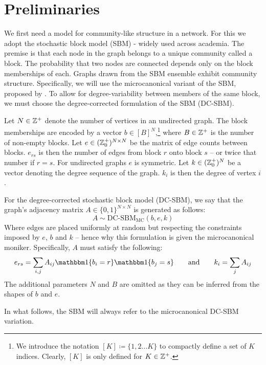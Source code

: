 \section{Preliminaries}

We first need a model for community-like structure in a network. For this we adopt the stochastic block model (SBM) - widely used across academia. The premise is that each node in the graph belongs to a unique community called a block. The probability that two nodes are connected depends only on the block memberships of each. Graphs drawn from the SBM ensemble exhibit community structure. Specifically, we will use the microcanonical variant of the SBM, proposed by \citet{Peixoto-Bayesian-Microcanonical}. To allow for degree-variability between members of the same block, we must choose the degree-corrected formulation of the SBM (DC-SBM).

\begin{definition}
	\label{defn:microcan-dc-sbm}
	Let $N \in \mathbb{Z}^{+}$ denote the number of vertices in an undirected graph. The block memberships are encoded by a vector $b \in [B]^N$,\footnote{We introduce the notation $[K] \coloneqq \{1, 2 \dots K\}$ to compactly define a set of $K$ indices. Clearly, $[K]$ is only defined for $K \in \mathbb{Z}^+$.}
	where $B \in \mathbb{Z}^{+}$ is the number of non-empty blocks.
	Let $e \in (\mathbb{Z}_0^+)^{N \times N}$ be the matrix of edge counts between blocks. $e_{rs}$ is then the number of edges from block $r$ onto block $s$ -- or twice that number if $r=s$. For undirected graphs $e$ is symmetric.
	Let $k \in (\mathbb{Z}^+_0)^N$ be a vector denoting the degree sequence of the graph. $k_i$ is then the degree of vertex $i$.
	
	For the degree-corrected stochastic block model (DC-SBM), we say that the graph's adjacency matrix $A \in \{0,1\}^{N \times N}$ is generated as follows:
	\begin{equation}
		A \sim \textrm{DC-SBM}_{\textrm{MC}} (b, e, k)
	\end{equation}
	Where edges are placed uniformly at random but respecting the constraints imposed by $e$, $b$ and $k$ -- hence why this formulation is given the microcanonical moniker. Specifically, $A$ must satisfy the following:
	\begin{equation}
		e_{rs} = \sum_{i, j} A_{ij} \one \{b_i = r\} \one \{b_j = s\} \qquad \textrm{and} \qquad
		k_i = \sum_j A_{ij}
		\label{eqn:sbm-constraints}
	\end{equation}
	The additional parameters $N$ and $B$ are omitted as they can be inferred from the shapes of $b$ and $e$.
\end{definition}

In what follows, the SBM will always refer to the microcanonical DC-SBM variation.